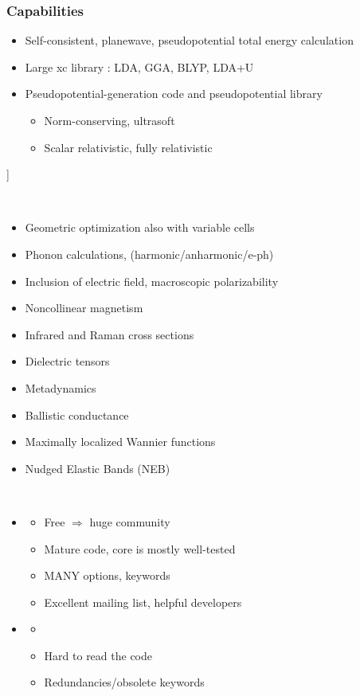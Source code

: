 \documentclass[]{beamer}
\newcommand{\blue}{\color{blue}}
\begin{document}
\begin{frame}
\frametitle{Capabilities}
\begin{itemize}
\item Self-consistent, planewave, pseudopotential total energy calculation
\item Large xc library : LDA, GGA, BLYP, LDA+U
\item Pseudopotential-generation code and pseudopotential library
\begin{itemize}
\item Norm-conserving, ultrasoft
\item Scalar relativistic, fully relativistic
\end{itemize}
\end{itemize}
\end{frame}
]
{ 

\textcolor{white}{...}
	\begin{itemize}
		\item Geometric optimization also with variable cells
		\item Phonon calculations, (harmonic/anharmonic/e-ph)
		\item Inclusion of electric field, macroscopic polarizability
		\item Noncollinear magnetism
		\item Infrared and Raman cross sections
		\item Dielectric tensors
		\item Metadynamics
		\item Ballistic conductance
		\item Maximally localized Wannier functions
		\item Nudged Elastic Bands (NEB)
		\end{itemize} 
\textcolor{white}{...}
}
\begin{frame}
\begin{itemize}
\item {\blue{Pros : }} 
\begin{itemize}
\item Free $\Rightarrow$ huge community  
\item Mature code, core is mostly well-tested 
\item MANY options, keywords 
\item Excellent mailing list, helpful developers
\end{itemize}
\item {\blue{Cons : }}
\begin{itemize}
\item 
\item Hard to read the code
\item Redundancies/obsolete keywords
\end{itemize}
\end{itemize}
\end{frame}
\end{document}
